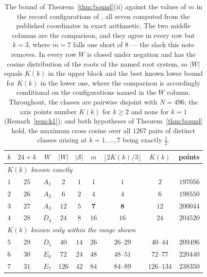 \documentclass[11pt]{amsart}
\theoremstyle{remark}
\begin{document}
\begin{table}[t]
\centering
{\small\setlength{\tabcolsep}{4.5pt}
\begin{tabular}{ccccccccr}
\toprule
$k$ & $24+k$ & $W$ & $|W|$ & $|\mathcal S|$ & $m$
    & $\lfloor 2K(k)/3\rfloor$ & $K(k)$ & points\\
\midrule
\multicolumn{9}{l}{\itshape $K(k)$ known exactly}\\
$1$ & $25$ & $A_1$ & $2$   & $1$  & $1$  & $1$  & $2$  & $197056$\\
$2$ & $26$ & $A_2$ & $6$   & $2$  & $4$  & $4$  & $6$  & $198550$\\
$3$ & $27$ & $A_3$ & $12$  & $5$  & $\mathbf{7}$ & $\mathbf{8}$ & $12$ & $200044$\\
$4$ & $28$ & $D_4$ & $24$  & $8$  & $16$ & $16$ & $24$ & $204520$\\
\midrule
\multicolumn{9}{l}{\itshape $K(k)$ known only within the range shown}\\
$5$ & $29$ & $D_5$ & $40$  & $14$ & $26$ & $26$--$29$ & $40$--$44$   & $209496$\\
$6$ & $30$ & $E_6$ & $72$  & $24$ & $48$ & $48$--$51$ & $72$--$77$   & $220440$\\
$7$ & $31$ & $E_7$ & $126$ & $42$ & $84$ & $84$--$89$ & $126$--$134$ & $238350$\\
\bottomrule
\end{tabular}}
\caption{The bound of Theorem~\ref{thm:bound}(ii) against the values of $m$ in
the record configurations of \cite{ma2025,cohn-data}, all seven computed from
the published coordinates in exact arithmetic. The two middle columns are the
comparison, and they agree in every row but $k=3$, where $m=7$ falls one short
of $8$ --- the slack this note removes. In every row $W$ is closed under
negation and has the cosine distribution of the roots of the named root system,
so $|W|$ equals $K(k)$ in the upper block and the best known lower bound for
$K(k)$ in the lower one, where the comparison is accordingly conditional on the
configurations named in the $W$ column. Throughout, the classes are pairwise
disjoint with $N=496$; the axis points number $K(k)$ for $k\ge2$ and none for
$k=1$ (Remark~\ref{rem:k1}); and both hypotheses of Theorem~\ref{thm:bound}
hold, the maximum cross cosine over all $1267$ pairs of distinct classes
arising at $k=1,\dots,7$ being exactly $\tfrac12$.}
\label{tab:m}
\end{table}
\end{document}
